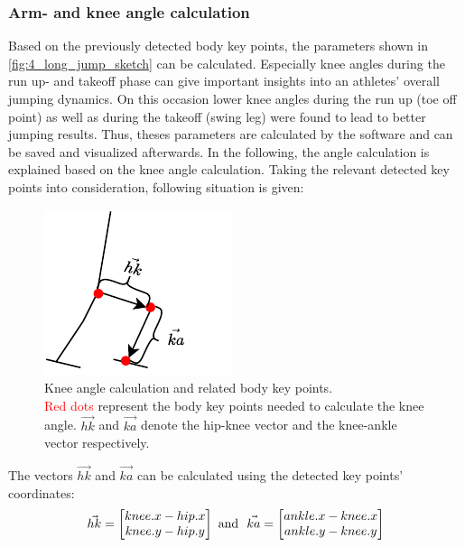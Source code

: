 \subsubsection*{Arm- and knee angle calculation}
Based on the previously detected body key points, the parameters shown in
\autoref{fig:4_long_jump_sketch} can be calculated.
Especially knee angles during the run up- and takeoff phase can give important
insights into an athletes' overall jumping dynamics.
On this occasion lower knee angles during the run up (toe off point) as well
as during the takeoff (swing leg) were found to lead to better jumping
results.
Thus, theses parameters are calculated by the software and can be saved and
visualized afterwards.
In the following, the angle calculation is explained based on the knee angle
calculation.
Taking the relevant detected key points into consideration, following
situation is given:
\begin{figure}[!h]
    \centering
    \includegraphics[scale=0.9]{knee_angles_calc.pdf}
    \caption[Knee angle calculation]{Knee angle calculation and related body
    key points.\\
    \textcolor{red}{Red dots} represent the body key points needed to calculate
    the knee angle. $\vec{hk}$ and $\vec{ka}$ denote the hip-knee vector and
    the knee-ankle vector respectively.}
    \label{fig:4_knee_angle_calculation}
\end{figure}
\FloatBarrier
\noindent The vectors $\vec{hk}$ and $\vec{ka}$ can be calculated using the
detected key points' coordinates:
\begin{equation}\label{eq:knee_angle_vectors}
    \vec{hk} = \begin{bmatrix}
        knee.x - hip.x \\
        knee.y - hip.y
    \end{bmatrix} \\
    \text{\ and \ }
    \hfill
    \vec{ka} = \begin{bmatrix}
        ankle.x - knee.x \\
        ankle.y - knee.y
    \end{bmatrix}
\end{equation}
